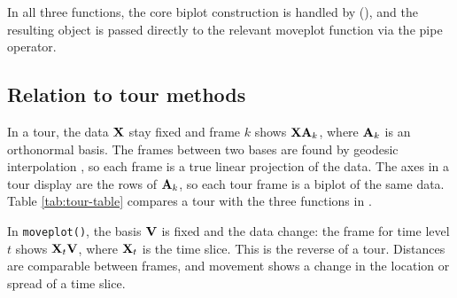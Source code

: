 In all three functions, the core biplot construction is handled by  (\citet{biplotEZ}), and the resulting object is passed directly to the relevant moveplot function via the pipe operator.

\subsection{Relation to tour methods}\label{tour-relation}

In a tour, the data \({\bf{X}}\) stay fixed and frame \(k\) shows \({\bf{XA}}_k\), where \({\bf{A}}_k\) is an orthonormal basis. The frames between two bases are found by geodesic interpolation \citep{Buja2005}, so each frame is a true linear projection of the data. The axes in a tour display are the rows of \({\bf{A}}_k\), so each tour frame is a biplot of the same data. Table \ref{tab:tour-table} compares a tour with the three functions in .

\begin{table}[!h]
\centering
\caption{\label{tab:tour-table}A tour compared with the three moveEZ functions.}
\centering
{}
\end{table}

In \texttt{moveplot()}, the basis \({\bf{V}}\) is fixed and the data change: the frame for time level \(t\) shows \({\bf{X}}_t{\bf{V}}\), where \({\bf{X}}_t\) is the time slice. This is the reverse of a tour. Distances are comparable between frames, and movement shows a change in the location or spread of a time slice.

